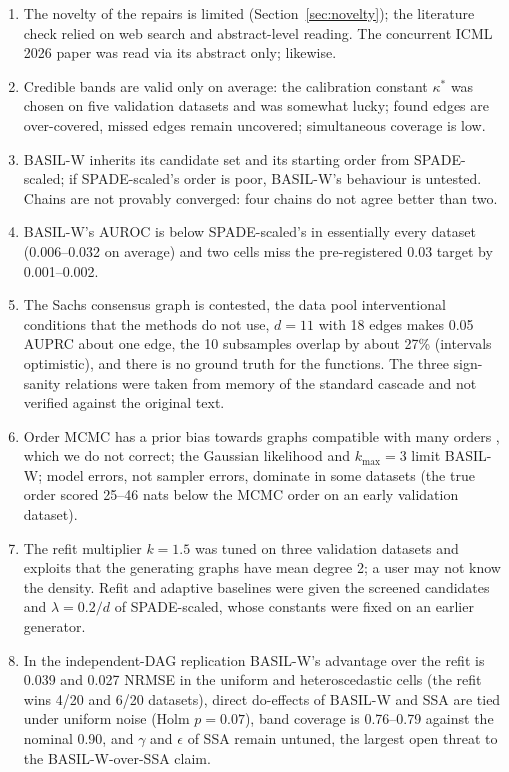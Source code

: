 \documentclass[11pt,a4paper]{article}
\begin{document}
\begin{enumerate}[leftmargin=*,itemsep=2pt]
  \item The novelty of the repairs is limited (Section~\ref{sec:novelty}); the literature check relied on web search and abstract-level reading. The concurrent ICML 2026 paper \citep{yao2026} was read via its abstract only; \citet{kuskova2026} likewise.
  \item Credible bands are valid only on average: the calibration constant $\kappa^\ast$ was chosen on five validation datasets and was somewhat lucky; found edges are over-covered, missed edges remain uncovered; simultaneous coverage is low.
  \item BASIL-W inherits its candidate set and its starting order from SPADE-scaled; if SPADE-scaled's order is poor, BASIL-W's behaviour is untested. Chains are not provably converged: four chains do not agree better than two.
  \item BASIL-W's AUROC is below SPADE-scaled's in essentially every dataset (0.006--0.032 on average) and two cells miss the pre-registered 0.03 target by 0.001--0.002.
  \item The Sachs consensus graph is contested, the data pool interventional conditions that the methods do not use, $d=11$ with 18 edges makes 0.05 AUPRC about one edge, the 10 subsamples overlap by about 27\% (intervals optimistic), and there is no ground truth for the functions. The three sign-sanity relations were taken from memory of the standard cascade and not verified against the original text.
  \item Order MCMC has a prior bias towards graphs compatible with many orders \citep{viinikka2020}, which we do not correct; the Gaussian likelihood and $k_{\max}=3$ limit BASIL-W; model errors, not sampler errors, dominate in some datasets (the true order scored 25--46 nats below the MCMC order on an early validation dataset).
  \item The refit multiplier $k=1.5$ was tuned on three validation datasets and exploits that the generating graphs have mean degree 2; a user may not know the density. Refit and adaptive baselines were given the screened candidates and $\lambda=0.2/d$ of SPADE-scaled, whose constants were fixed on an earlier generator.
  \item In the independent-DAG replication BASIL-W's advantage over the refit is 0.039 and 0.027 NRMSE in the uniform and heteroscedastic cells (the refit wins 4/20 and 6/20 datasets), direct do-effects of BASIL-W and SSA are tied under uniform noise (Holm $p=0.07$), band coverage is 0.76--0.79 against the nominal 0.90, and $\gamma$ and $\epsilon$ of SSA remain untuned, the largest open threat to the BASIL-W-over-SSA claim.

\end{enumerate}
\end{document}
